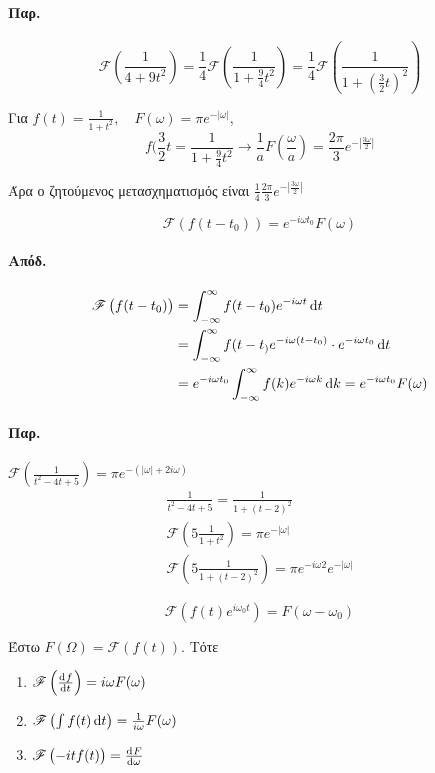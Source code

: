 \documentclass[11pt,a4paper,titlepage,final]{article}
\begin{document}
\paragraph{Παρ.}
\[
 \mathscr{F} \left( \frac{1}{4+9t^2} \right)
 = \frac{1}{4} \mathscr{F} \left( \frac{1}{1+\frac{9}{4}t^2} \right)
 = \frac{1}{4}  \mathscr{F} \left( \frac{1}{1+\left(\frac{3}{2}t\right)^2} \right)
\]

Για \(f(t) = \frac{1}{1+t^2}, \quad F(\omega) = \pi e^{-|\omega|}\),
\[
f(\frac{3}{2}t = \frac{1}{1+\frac{9}{4}t^2} \rightarrow
\frac{1}{a} F\left(\frac{\omega}{a}\right) = \frac{2\pi}{3} e^{-\left|\frac{3\omega}{2}\right|}
\]

Άρα ο ζητούμενος μετασχηματισμός είναι \(
\frac{1}{4} \frac{2\pi}{3} e^{-\left|\frac{3\omega}{2}\right|}
\)

\begin{theorem*}{}
	\[
	\mathscr F \left( f(t-t_0)\right) = e^{-i\omega t_0}F(\omega)
	\]
\end{theorem*}
\paragraph{Απόδ.}
\begin{align*}
	\mathscr F \left(f(t-t_0)\right) &= \int_{-\infty}^{\infty} f(t-t_0)e^{-i\omega t}\dif t
	\\ &= \int_{-\infty}^{\infty}f(t-t_)e^{-i\omega(t-t_0)}\cdot e^{-i\omega t_0} \dif t
	\\ &= e^{-i\omega t_0}\int_{-\infty}^{\infty} f(k)e^{-i\omega k}\dif k
	= e^{-i\omega t_0} F(\omega)
\end{align*}
\paragraph{Παρ.}
\(
\mathscr F \left(\frac{1}{t^2-4t+5}\right) = \pi e^{-\left( |\omega| + 2i\omega \right)}
\)
\begin{gather*}
	\frac{1}{t^2-4t+5} = \frac{1}{1+(t-2)^2} \\
	\mathscr F \left(5\frac{1}{1+t^2}\right) = \pi e^{-|\omega|} \\
	\mathscr F \left(5\frac{1}{1+(t-2)^2}\right) = \pi e^{-i\omega 2} e^{-|\omega|}
\end{gather*}

\begin{theorem*}{}
	\[
	\mathscr F \left(f(t)e^{i\omega_0 t}\right) = F(\omega-\omega_0)
	\]
\end{theorem*}


\begin{theorem*}{}
Έστω \(F(\Omega) = \mathscr{F}(f(t))\). Τότε
\begin{enumerate}
\item \(\mathscr{F}\left(\od{f}{t}\right) = i\omega F(\omega)\)
\item \(\mathscr{F}\left(\int f(t)\dif t\right) = \frac{1}{i\omega}F( \omega )\)
\item \(\mathscr{F}\left(-itf(t)\right) = \od{F}{\omega}\)
\end{enumerate}
\end{theorem*}
\end{document}
